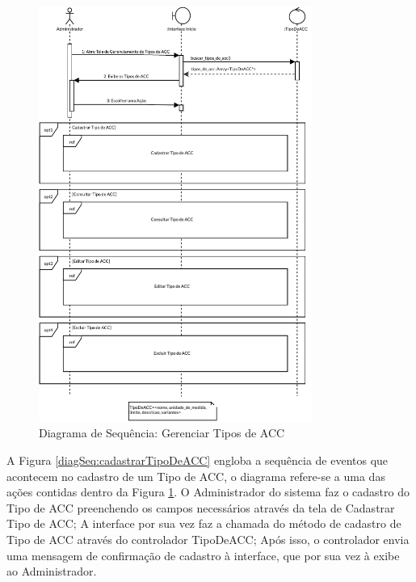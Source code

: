 \begin{figure}[H]
    \centering
    \includegraphics[width=0.8\textwidth]{dados/figuras/Proposta/DiagramasDeSequencia/Gerenciar Tipos de ACC-Completo.pdf}
    \caption{Diagrama de Sequência: Gerenciar Tipos de ACC}
    \label{diagSeq:gerenciarTiposDeACC}
\end{figure}

A Figura \ref{diagSeq:cadastrarTipoDeACC} engloba a sequência de eventos que acontecem no cadastro de um Tipo de ACC, o diagrama refere-se a uma das ações contidas dentro da Figura \ref{diagSeq:gerenciarTiposDeACC}. O Administrador do sistema faz o cadastro do Tipo de ACC preenchendo os campos necessários através da tela de Cadastrar Tipo de ACC; A interface por sua vez faz a chamada do método de cadastro de Tipo de ACC através do controlador TipoDeACC; Após isso, o controlador envia uma mensagem de confirmação de cadastro à interface, que por sua vez à exibe ao Administrador.

